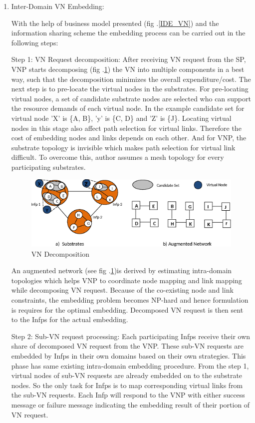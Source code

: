 \documentclass[article,dr=phil,type=msc ,colorback,accentcolor=tud4b]{tudthesis}
\begin{document}
\begin{enumerate}[label=(\Alph*)]
\item 	Inter-Domain VN Embedding:

With the help of business model presented (fig .\ref{IDE_VN}) and the information sharing scheme the embedding process can be carried out in the following steps:

Step 1:  VN Request decomposition: After receiving VN request from the SP, VNP starts decomposing (fig .\ref{IDE_decomp}) the VN into multiple components in a best way, such that the decomposition minimizes the overall expenditure/cost. The next step is to pre-locate the virtual nodes in the substrates. For pre-locating virtual nodes, a set of candidate substrate nodes are selected who can support the resource demands of each virtual node. In the example candidate set for virtual node 'X' is \{A, B\}, 'y' is \{C, D\} and 'Z' is \{J\}.  Locating virtual nodes in this stage also affect path selection for virtual links. Therefore the cost of embedding nodes and links depends on each other. And for VNP, the substrate topology is invisible which makes path selection for virtual link difficult. To overcome this, author assumes a mesh topology for every participating substrates. 

\begin{figure}[h]
	\centering
	\includegraphics[width=\linewidth]{inter-doamin_1}
	\caption{VN Decomposition}
	\label{IDE_decomp}
\end{figure}
An augmented network (see fig .\ref{IDE_decomp})is derived by estimating intra-domain topologies which helps VNP to coordinate node mapping and link mapping while decomposing VN request. Because of the co-existing node and link constraints, the embedding problem becomes NP-hard and hence formulation is requires for the optimal embedding. Decomposed VN request is then sent to the Infps for the actual embedding.

Step 2: Sub-VN request processing: Each participating Infps receive their own share of decomposed VN request from the VNP. These sub-VN requests are embedded by Infps in their own domains based on their own strategies. This phase has same existing intra-domain embedding procedure. From the step 1, virtual nodes of sub-VN requests are already embedded on to the substrate nodes. So the only task for Infps is to map corresponding virtual links from the sub-VN requests. Each Infp will respond to the VNP with either success message or failure message indicating the embedding result of their portion of VN request. 


\end{enumerate}
\end{document}
